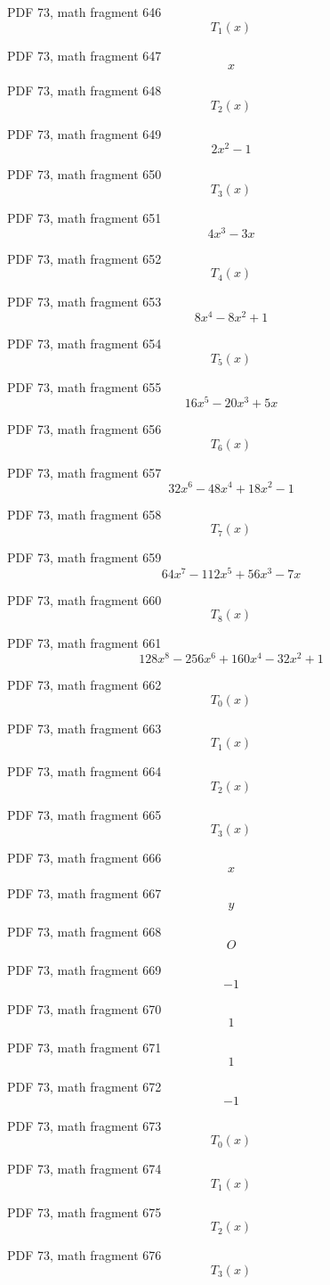 \documentclass[UTF8,fontset=fandol]{ctexart}
\begin{document}
\par
PDF 73, math fragment 646
\[T_1(x)\]
\par
PDF 73, math fragment 647
\[x\]
\par
PDF 73, math fragment 648
\[T_2(x)\]
\par
PDF 73, math fragment 649
\[2x^2-1\]
\par
PDF 73, math fragment 650
\[T_3(x)\]
\par
PDF 73, math fragment 651
\[4x^3-3x\]
\par
PDF 73, math fragment 652
\[T_4(x)\]
\par
PDF 73, math fragment 653
\[8x^4-8x^2+1\]
\par
PDF 73, math fragment 654
\[T_5(x)\]
\par
PDF 73, math fragment 655
\[16x^5-20x^3+5x\]
\par
PDF 73, math fragment 656
\[T_6(x)\]
\par
PDF 73, math fragment 657
\[32x^6-48x^4+18x^2-1\]
\par
PDF 73, math fragment 658
\[T_7(x)\]
\par
PDF 73, math fragment 659
\[64x^7-112x^5+56x^3-7x\]
\par
PDF 73, math fragment 660
\[T_8(x)\]
\par
PDF 73, math fragment 661
\[128x^8-256x^6+160x^4-32x^2+1\]
\par
PDF 73, math fragment 662
\[T_0(x)\]
\par
PDF 73, math fragment 663
\[T_1(x)\]
\par
PDF 73, math fragment 664
\[T_2(x)\]
\par
PDF 73, math fragment 665
\[T_3(x)\]
\par
PDF 73, math fragment 666
\[x\]
\par
PDF 73, math fragment 667
\[y\]
\par
PDF 73, math fragment 668
\[O\]
\par
PDF 73, math fragment 669
\[-1\]
\par
PDF 73, math fragment 670
\[1\]
\par
PDF 73, math fragment 671
\[1\]
\par
PDF 73, math fragment 672
\[-1\]
\par
PDF 73, math fragment 673
\[T_0(x)\]
\par
PDF 73, math fragment 674
\[T_1(x)\]
\par
PDF 73, math fragment 675
\[T_2(x)\]
\par
PDF 73, math fragment 676
\[T_3(x)\]
\par
\end{document}
